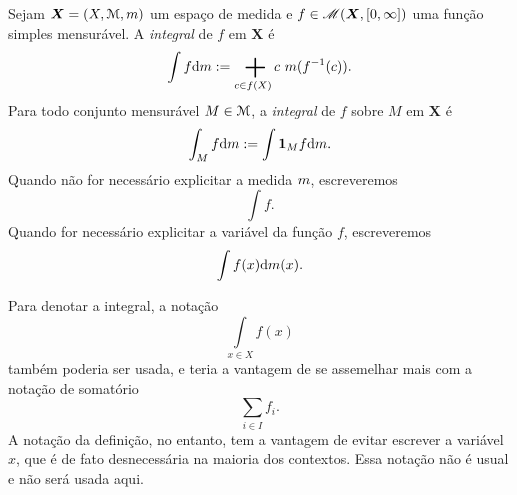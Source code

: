 \begin{definition}
Sejam $\bm X = (X,\mathcal{M},m)$ um espaço de medida e $f\in \mathscr{M}(\bm X,\left[{0},{\infty}\right])$ uma função simples mensurável.
A \emph{integral} de $f$ em $\bm X$ é
	\begin{equation*}
	\int f \dd\med := \sum_{c \in f(X)} c \ \med(f\inv(c)).
	\end{equation*}
Para todo conjunto mensurável $M \in \mathcal{M}$, a \emph{integral} de $f$ sobre $M$ em $\bm X$ é
	\begin{equation*}
	\int_M f \mathrm{d}m := \int {\bm 1}_M f \mathrm{d}m.
	\end{equation*}
Quando não for necessário explicitar a medida $m$, escreveremos
	\begin{equation*}
	\int f.
	\end{equation*}
Quando for necessário explicitar a variável da função $f$, escreveremos
	\begin{equation*}
	\int f(x) \mathrm{d} m(x).
	\end{equation*}
\end{definition}

Para denotar a integral, a notação
	\begin{equation*}
	\int\limits_{x \in X} f(x)
	\end{equation*}
também poderia ser usada, e teria a vantagem de se assemelhar mais com a notação de somatório
	\begin{equation*}
	\sum_{i \in I} f_i.
	\end{equation*}
A notação da definição, no entanto, tem a vantagem de evitar escrever a variável $x$, que é de fato desnecessária na maioria dos contextos. Essa notação não é usual e não será usada aqui.

